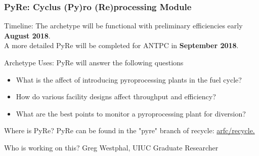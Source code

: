\begin{frame}
	\frametitle{PyRe: Cyclus (Py)ro (Re)processing Module}
	\begin{block}{Timeline:} 
	The archetype will be functional with preliminary efficiencies early \textbf{August 2018}. \\
	A more detailed PyRe will be completed for ANTPC in \textbf{September 2018}.
	\end{block}
	\begin{block}{Archetype Uses:} 
	PyRe will answer the following questions
	\begin{itemize}
		\item What is the affect of introducing pyroprocessing plants in the fuel cycle?
		\item How do various facility designs affect throughput and efficiency?
		\item What are the best points to monitor a pyroprocessing plant for diversion?
	\end{itemize}
	\end{block}
	\begin{block}{Where is PyRe?} 
	PyRe can be found in the "pyre" branch of recycle: 	\href{https://github.com/arfc/recycle}{arfc/recycle.} 
	\end{block}
	\begin{block}{Who is working on this?}
	Greg Westphal, UIUC Graduate Researcher
	\end{block}
\end{frame}